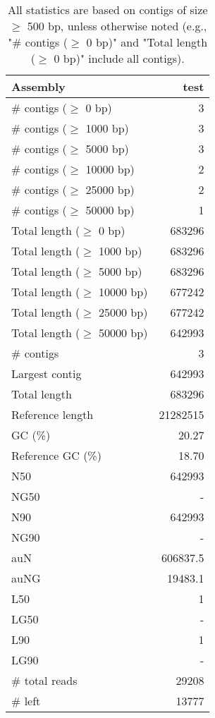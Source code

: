 \documentclass[12pt,a4paper]{article}
\begin{document}
\begin{table}[ht]
\begin{center}
\caption{All statistics are based on contigs of size $\geq$ 500 bp, unless otherwise noted (e.g., "\# contigs ($\geq$ 0 bp)" and "Total length ($\geq$ 0 bp)" include all contigs).}
\begin{tabular}{|l*{1}{|r}|}
\hline
Assembly & test \\ \hline
\# contigs ($\geq$ 0 bp) & 3 \\ \hline
\# contigs ($\geq$ 1000 bp) & 3 \\ \hline
\# contigs ($\geq$ 5000 bp) & 3 \\ \hline
\# contigs ($\geq$ 10000 bp) & 2 \\ \hline
\# contigs ($\geq$ 25000 bp) & 2 \\ \hline
\# contigs ($\geq$ 50000 bp) & 1 \\ \hline
Total length ($\geq$ 0 bp) & 683296 \\ \hline
Total length ($\geq$ 1000 bp) & 683296 \\ \hline
Total length ($\geq$ 5000 bp) & 683296 \\ \hline
Total length ($\geq$ 10000 bp) & 677242 \\ \hline
Total length ($\geq$ 25000 bp) & 677242 \\ \hline
Total length ($\geq$ 50000 bp) & 642993 \\ \hline
\# contigs & 3 \\ \hline
Largest contig & 642993 \\ \hline
Total length & 683296 \\ \hline
Reference length & 21282515 \\ \hline
GC (\%) & 20.27 \\ \hline
Reference GC (\%) & 18.70 \\ \hline
N50 & 642993 \\ \hline
NG50 & - \\ \hline
N90 & 642993 \\ \hline
NG90 & - \\ \hline
auN & 606837.5 \\ \hline
auNG & 19483.1 \\ \hline
L50 & 1 \\ \hline
LG50 & - \\ \hline
L90 & 1 \\ \hline
LG90 & - \\ \hline
\# total reads & 29208 \\ \hline
\# left & 13777 \\ \hline

\end{tabular}
\end{center}
\end{table}
\end{document}
